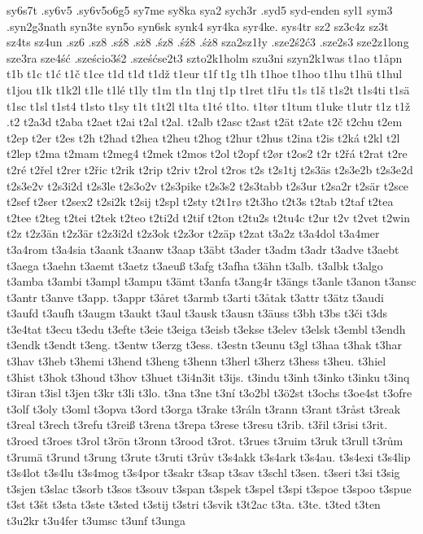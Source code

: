 {{sy6s7t
.sy6v5
.sy6v5o6g5
sy7me
sy8ka
sya2
sych3r
.syd5
syd-enden
syl1
sym3
.syn2g3nath
syn3te
syn5o
syn6sk
synk4
syr4ka
syr4ke.
sys4tr
sz2
sz3c4z
sz3t
sz4ts
sz4un
.sz6
.sz8
.sź8
.sż8
.śz8
.śź8
.śż8
sza2sz1ły
.sze2ś2ć3
.sze2s3
sze2z1long
sze3ra
sze4ść
.sześcio3ś2
.sześćse2t3
szto2k1holm
szu3ni
szyn2k1was
t1ao
t1åpn
t1b
t1c
t1ć
t1č
t1ce
t1d
t1đ
t1dž
t1eur
t1f
t1g
t1h
t1hoe
t1hoo
t1hu
t1hü
t1hul
t1jou
t1k
t1k2l
t1le
t1lé
t1ly
t1m
t1n
t1nj
t1p
t1ret
t1řu
t1s
t1š
t1s2t
t1s4ti
t1sä
t1sc
t1sl
t1st4
t1sto
t1sy
t1t
t1t2l
t1ta
t1té
t1to.
t1tør
t1tum
t1uke
t1utr
t1z
t1ž
.t2
t2a3d
t2aba
t2aet
t2ai
t2al
t2al.
t2alb
t2asc
t2ast
t2ät
t2ate
t2č
t2chu
t2em
t2ep
t2er
t2es
t2h
t2had
t2hea
t2heu
t2hog
t2hur
t2hus
t2ina
t2is
t2ká
t2kl
t2l
t2lep
t2ma
t2mam
t2meg4
t2mek
t2mos
t2ol
t2opf
t2ør
t2os2
t2r
t2řá
t2rat
t2re
t2ré
t2řel
t2rer
t2řic
t2rik
t2rip
t2riv
t2rol
t2ros
t2s
t2s1tj
t2s3äs
t2s3e2b
t2s3e2d
t2s3e2v
t2s3i2d
t2s3le
t2s3o2v
t2s3pike
t2s3s2
t2s3tabb
t2s3ur
t2sa2r
t2sär
t2sce
t2sef
t2ser
t2sex2
t2si2k
t2sij
t2spl
t2sty
t2t1rø
t2t3ho
t2t3s
t2tab
t2taf
t2tea
t2tee
t2teg
t2tei
t2tek
t2teo
t2ti2d
t2tif
t2ton
t2tu2s
t2tu4c
t2ur
t2v
t2vet
t2win
t2z
t2z3än
t2z3är
t2z3i2d
t2z3ok
t2z3or
t2zäp
t2zat
t3a2z
t3a4dol
t3a4mer
t3a4rom
t3a4sia
t3aank
t3aanw
t3aap
t3äbt
t3ader
t3adm
t3adr
t3adve
t3aebt
t3aega
t3aehn
t3aemt
t3aetz
t3aeuß
t3afg
t3afha
t3ähn
t3alb.
t3albk
t3algo
t3amba
t3ambi
t3ampl
t3ampu
t3ämt
t3anfa
t3ang4r
t3ängs
t3anle
t3anon
t3ansc
t3antr
t3anve
t3app.
t3appr
t3året
t3armb
t3arti
t3åtak
t3attr
t3ätz
t3audi
t3aufd
t3aufh
t3augm
t3aukt
t3aul
t3ausk
t3ausn
t3äuss
t3bh
t3bs
t3či
t3ds
t3e4tat
t3ecu
t3edu
t3efte
t3eie
t3eiga
t3eisb
t3ekse
t3elev
t3elsk
t3embl
t3endh
t3endk
t3endt
t3eng.
t3entw
t3erzg
t3ess.
t3estn
t3eunu
t3gl
t3haa
t3hak
t3har
t3hav
t3heb
t3hemi
t3hend
t3heng
t3henn
t3herl
t3herz
t3hess
t3heu.
t3hiel
t3hist
t3hok
t3houd
t3hov
t3huet
t3i4n3it
t3ijs.
t3indu
t3inh
t3inko
t3inku
t3inq
t3iran
t3isl
t3jen
t3kr
t3li
t3lo.
t3na
t3ne
t3ní
t3o2bl
t3ö2st
t3ochs
t3oe4st
t3ofre
t3olf
t3oly
t3oml
t3opva
t3ord
t3orga
t3rake
t3ráln
t3rann
t3rant
t3råst
t3reak
t3real
t3rech
t3refu
t3reiß
t3rena
t3repa
t3rese
t3resu
t3rib.
t3řil
t3risi
t3rit.
t3roed
t3roes
t3rol
t3rön
t3ronn
t3rood
t3rot.
t3rues
t3ruim
t3ruk
t3rull
t3rům
t3rumä
t3rund
t3rung
t3rute
t3ruti
t3rův
t3s4akk
t3s4ark
t3s4au.
t3s4exi
t3s4lip
t3s4lot
t3s4lu
t3s4mog
t3s4por
t3sakr
t3sap
t3sav
t3schl
t3sen.
t3seri
t3si
t3sig
t3sjen
t3slac
t3sorb
t3sos
t3souv
t3span
t3spek
t3spel
t3spi
t3spoe
t3spoo
t3spue
t3st
t3št
t3sta
t3ste
t3sted
t3stij
t3stri
t3svik
t3t2ac
t3ta.
t3te.
t3ted
t3ten
t3u2kr
t3u4fer
t3umsc
t3unf
t3unga
}}
